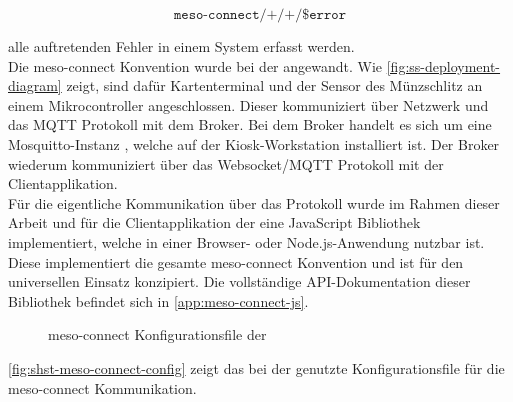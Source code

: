 \[\texttt{meso-connect/+/+/\$error} \]

alle auftretenden Fehler in einem System erfasst werden.\\

Die meso-connect Konvention wurde bei der \shst{} angewandt. Wie \autoref{fig:ss-deployment-diagram} zeigt,
sind dafür Kartenterminal und der Sensor des Münzschlitz an einem Mikrocontroller angeschlossen. Dieser
kommuniziert über Netzwerk und das MQTT Protokoll mit dem Broker. Bei dem Broker handelt es sich um 
eine Mosquitto-Instanz \cite{mosquitto}, welche auf der Kiosk-Workstation installiert ist. 
Der Broker wiederum kommuniziert über das Websocket/MQTT Protokoll
mit der Clientapplikation.\\
Für die eigentliche Kommunikation über das Protokoll wurde im Rahmen dieser Arbeit und für die Clientapplikation 
der \shst{} eine JavaScript Bibliothek implementiert, welche in einer Browser- oder Node.js-Anwendung
nutzbar ist. Diese implementiert die gesamte meso-connect Konvention und ist für den universellen Einsatz
konzipiert. Die vollständige API-Dokumentation dieser Bibliothek befindet sich in \autoref{app:meso-connect-js}.

\begin{figure}
  
  \caption{meso-connect Konfigurationsfile der \shst{}}
  \label{fig:shst-meso-connect-config}
\end{figure}

\autoref{fig:shst-meso-connect-config} zeigt das bei der \shst{} genutzte Konfigurationsfile für die 
meso-connect Kommunikation.

\iffalse
- Konfigurationsfile, Beispiel der JS Bib 
- JS API Dokumentation in den Anhang
\fi